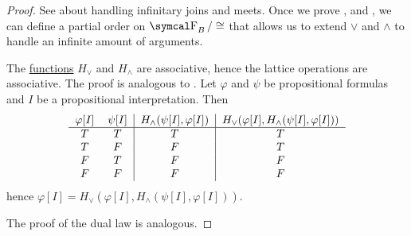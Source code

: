 \begin{proof}
  See  about handling infinitary joins and meets. Once we prove ,  and , we can define a partial order on \( \CF_B / \cong \) that allows us to extend \( \vee \) and \( \wedge \) to handle an infinite amount of arguments.

   The \hyperref[def:truth_functions]{functions} \( H_\vee \) and \( H_\wedge \) are associative, hence the lattice operations are associative.
   The proof is analogous to .
   Let \( \varphi \) and \( \psi \) be propositional formulas and \( I \) be a propositional interpretation. Then
  \begin{equation*}
    \begin{tabular}{c c | c | c}
      \( \varphi[I] \) & \( \psi[I] \) & \( H_\wedge(\psi[I], \varphi[I]) \) & \( H_\vee(\varphi[I], H_\wedge(\psi[I], \varphi[I])) \) \\
      \hline
      \( T \)          & \( T \)       & \( T \)                             & \( T \)                                                 \\
      \( T \)          & \( F \)       & \( F \)                             & \( T \)                                                 \\
      \( F \)          & \( T \)       & \( F \)                             & \( F \)                                                 \\
      \( F \)          & \( F \)       & \( F \)                             & \( F \)
    \end{tabular}
  \end{equation*}
  hence \( \varphi[I] = H_\vee(\varphi[I], H_\wedge(\psi[I], \varphi[I])) \).

  The proof of the dual law is analogous.


\end{proof}
